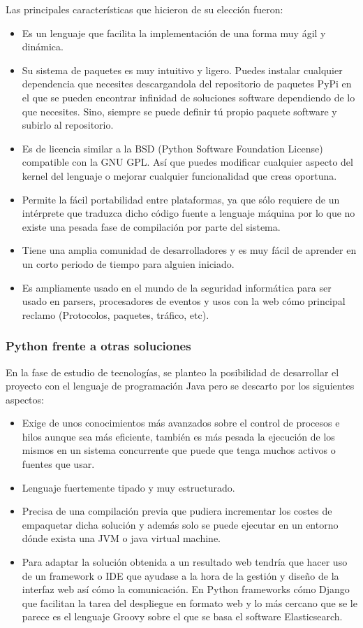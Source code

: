 Las principales características que hicieron de su elección fueron:
\begin{itemize}
\item Es un lenguaje que facilita la implementación de una forma muy ágil y dinámica.
\item Su sistema de paquetes es muy intuitivo y ligero. Puedes instalar cualquier dependencia que necesites descargandola del repositorio de paquetes PyPi en el que se pueden encontrar infinidad de soluciones software dependiendo de lo que necesites. Sino, siempre se puede definir tú propio paquete software y subirlo al repositorio.
\item Es de licencia similar a la BSD (Python Software Foundation License) compatible con la GNU GPL. Así que puedes modificar cualquier aspecto del kernel del lenguaje o mejorar cualquier funcionalidad que creas oportuna.
\item Permite la fácil portabilidad entre plataformas, ya que sólo requiere de un intérprete que traduzca dicho código fuente a lenguaje máquina por lo que no existe una pesada fase de compilación por parte del sistema.
\item Tiene una amplia comunidad de desarrolladores y es muy fácil de aprender en un corto periodo de tiempo para alguien iniciado.
\item Es ampliamente usado en el mundo de la seguridad informática para ser usado en parsers, procesadores de eventos y usos con la web cómo principal reclamo (Protocolos, paquetes, tráfico, etc).
\end{itemize}


\subsubsection{Python frente a otras soluciones}

En la fase de estudio de tecnologías, se planteo la posibilidad de desarrollar el proyecto con el lenguaje de programación Java pero se descarto por los siguientes aspectos:

\begin{itemize}
\item Exige de unos conocimientos más avanzados sobre el control de procesos e hilos aunque sea más eficiente, también es más pesada la ejecución de los mismos en un sistema concurrente que puede que tenga muchos activos o fuentes que usar.
\item Lenguaje fuertemente tipado y muy estructurado.
\item Precisa de una compilación previa que pudiera incrementar los costes de empaquetar dicha solución y además solo se puede ejecutar en un entorno dónde exista una JVM o java virtual machine.
\item Para adaptar la solución obtenida a un resultado web tendría que hacer uso de un framework o IDE que ayudase a la hora de la gestión y diseño de la interfaz web así cómo la comunicación. En Python frameworks cómo Django que facilitan la tarea del despliegue en formato web y lo más cercano que se le parece es el lenguaje Groovy sobre el que se basa el software Elasticsearch.
\end{itemize}

